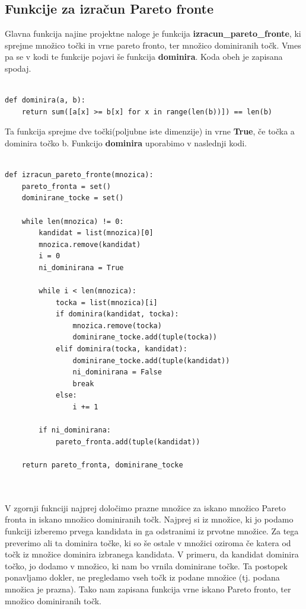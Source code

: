 \documentclass{article}
\begin{document}
\subsection{Funkcije za izračun Pareto fronte}

Glavna funkcija najine projektne naloge je funkcija \textbf{izracun\_pareto\_fronte}, ki sprejme množico točki in vrne pareto fronto, ter množico dominiranih točk. Vmes pa se v kodi te funkcije pojavi še funkcija \textbf{dominira}. Koda obeh je zapisana spodaj.

\begin{verbatim}

def dominira(a, b):
    return sum([a[x] >= b[x] for x in range(len(b))]) == len(b)
\end{verbatim}

Ta funkcija sprejme dve točki(poljubne iste dimenzije) in vrne \textbf{True}, če točka a dominira točko b. Funkcijo \textbf{dominira} uporabimo v naslednji kodi.

\begin{verbatim}

def izracun_pareto_fronte(mnozica): 
    pareto_fronta = set()
    dominirane_tocke = set()

    while len(mnozica) != 0:
        kandidat = list(mnozica)[0] 
        mnozica.remove(kandidat)
        i = 0
        ni_dominirana = True 

        while i < len(mnozica):
            tocka = list(mnozica)[i]
            if dominira(kandidat, tocka): 
                mnozica.remove(tocka)
                dominirane_tocke.add(tuple(tocka))
            elif dominira(tocka, kandidat):
                dominirane_tocke.add(tuple(kandidat))
                ni_dominirana = False
                break
            else:
                i += 1

        if ni_dominirana:   
            pareto_fronta.add(tuple(kandidat))
        
    return pareto_fronta, dominirane_tocke

  
\end{verbatim}

V zgornji fuknciji najprej določimo prazne množice za iskano množico Pareto fronta in iskano množico dominiranih točk. Najprej si iz množice, ki jo podamo funkciji izberemo prvega kandidata in ga odstranimi iz prvotne množice. Za tega preverimo ali ta dominira točke, ki so še ostale v množici oziroma če katera od točk iz množice dominira izbranega kandidata. V primeru, da kandidat dominira točko, jo dodamo v množico, ki nam bo vrnila dominirane točke.  Ta postopek ponavljamo dokler, ne pregledamo vseh točk iz podane množice (tj. podana množica je prazna). Tako nam zapisana funkcija vrne iskano Pareto fronto, ter množico dominiranih točk.
\end{document}
